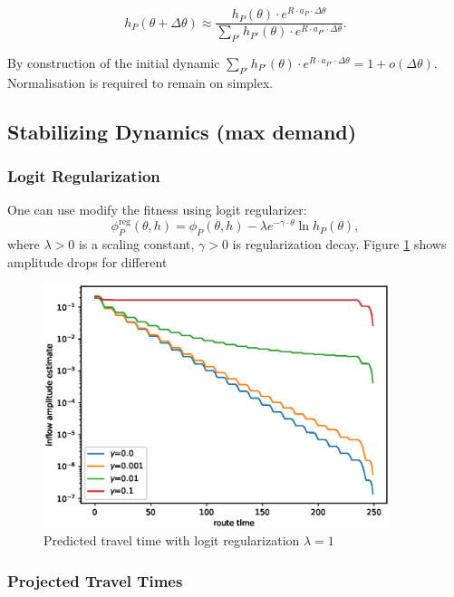 \documentclass[12pt]{article}
\begin{document}
$$ h_P(\theta + \Delta\theta) \approx \frac{ h_P(\theta) \cdot e^{ R \cdot a_P \cdot \Delta \theta }} { \sum_{P'}  h_{P'}(\theta) \cdot e^{ R \cdot a_{P'} \cdot \Delta\theta } } .$$

By construction of the initial dynamic $\sum_{P'}  h_{P'}(\theta) \cdot e^{ R \cdot a_{P'} \cdot \Delta\theta } = 1 + o(\Delta \theta)$. Normalisation is required to remain on simplex.

\newpage

\subsection*{Stabilizing Dynamics (max demand)}

\subsubsection*{Logit Regularization}

One can use modify the fitness using logit regularizer:
$$ \phi^{\text{reg}}_P(\theta, h) = \phi_P(\theta, h) - \lambda e^{-\gamma \cdot \theta} \ln{ h_P(\theta) }, $$
where $\lambda > 0$ is a scaling constant, $\gamma > 0$ is regularization decay. Figure \ref{fig:reg_pred_tt} shows amplitude drops for different 

\begin{figure}
	\includegraphics[width=0.9\textwidth]{img/reg_pred_tt.eps}
	\caption{Predicted travel time with logit regularization $\lambda=1$}
	\label{fig:reg_pred_tt}

\end{figure}

\subsubsection*{Projected Travel Times}
\end{document}

